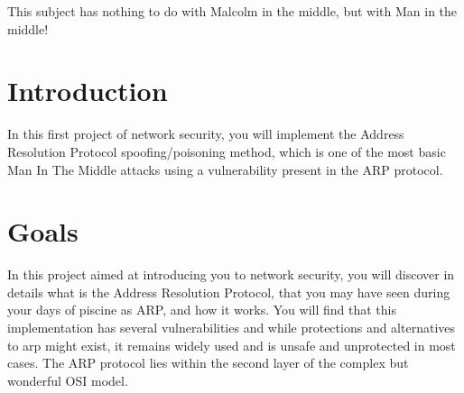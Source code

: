 \documentclass{42-en}
\begin{document}
    This subject has nothing to do with Malcolm in the middle, but with Man in the middle!\\
    \newpage
    
\chapter{Introduction}

    In this first project of network security, 
     you will implement the Address Resolution Protocol spoofing/poisoning method, which is one of the most basic Man In The Middle attacks 
     using a vulnerability present in the ARP protocol.



\chapter{Goals}

    In this project aimed at introducing you to network security,
     you will discover in details what is the Address Resolution Protocol,
      that you may have seen during your days of piscine as ARP, and how it 
      works. You will find that this implementation has several vulnerabilities 
      and while protections and alternatives to arp might exist,
       it remains widely used and is unsafe and unprotected in most cases.
    The ARP protocol lies within the second layer of the complex but wonderful OSI model.


\end{document}
